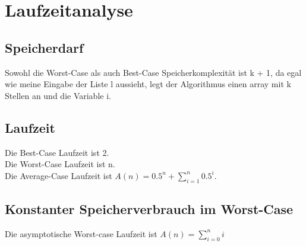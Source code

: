 \section{Laufzeitanalyse}
\subsection{Speicherdarf}
Sowohl die Worst-Case als auch Best-Case Speicherkomplexität ist k + 1, da egal wie meine Eingabe der Liste l aussieht, legt der Algorithmus einen array mit k Stellen an und die Variable i.
\subsection{Laufzeit}
Die Best-Case Laufzeit ist 2.\\
Die Worst-Case Laufzeit ist n.\\
Die Average-Case Laufzeit ist $A(n)= 0.5^n+\sum\nolimits_{i=1}^n 0.5^i$.\\
\subsection{Konstanter Speicherverbrauch im Worst-Case}

Die asymptotische Worst-case Laufzeit ist $A(n)=\sum\nolimits_{i=0}^n i$